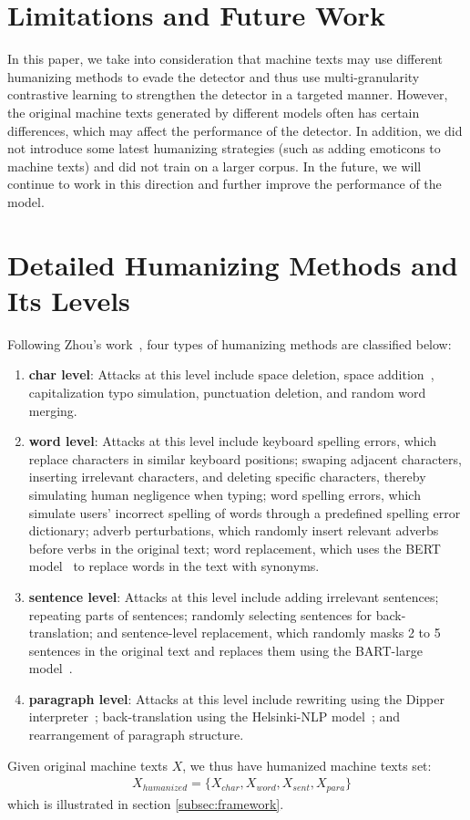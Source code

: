 \documentclass[11pt]{article}
\newcommand{\greenCitep}[1]{\textcolor{darkgreen}{\citep{#1}}}
\begin{document}
	
	\section{Limitations and Future Work}
	In this paper, we take into consideration that machine texts may use different humanizing methods to evade the detector and thus use multi-granularity contrastive learning to strengthen the detector in a targeted manner. However, the original machine texts generated by different models often has certain differences, which may affect the performance of the detector. In addition, we did not introduce some latest humanizing strategies (such as adding emoticons to machine texts) and did not train on a larger corpus. In the future, we will continue to work in this direction and further improve the performance of the model.

	\section{Detailed Humanizing Methods and Its Levels}
	\label{appendix:humanizing methods}
	Following Zhou's work~\cite{zhou2024navigatingshadows}, four types of humanizing methods are classified below:
	\begin{enumerate}
		\item \textbf{char level}: Attacks at this level include space deletion, space addition~\greenCitep{cai2023evadechatgpt}, capitalization typo simulation, punctuation deletion, and random word merging.
		\item \textbf{word level}: Attacks at this level include keyboard spelling errors, which replace characters in similar keyboard positions; swaping adjacent characters, inserting irrelevant characters, and deleting specific characters, thereby simulating human negligence when typing; word spelling errors, which simulate users' incorrect spelling of words through a predefined spelling error dictionary; adverb perturbations, which randomly insert relevant adverbs before verbs in the original text; word replacement, which uses the BERT model~\greenCitep{devlin2019bert} to replace words in the text with synonyms.
		\item \textbf{sentence level}: Attacks at this level include adding irrelevant sentences; repeating parts of sentences; randomly selecting sentences for back-translation; and sentence-level replacement, which randomly masks 2 to 5 sentences in the original text and replaces them using the BART-large model~\greenCitep{lewis2020bart}.
		\item \textbf{paragraph level}: Attacks at this level include rewriting using the Dipper interpreter~\greenCitep{krishna2024paraphrasing}; back-translation using the Helsinki-NLP model~\greenCitep{tiedemann2020opus}; and rearrangement of paragraph structure.
	\end{enumerate}
	Given original machine texts $X$, we thus have humanized machine texts set:
	$$
	\begin{aligned}
		&X_{humanized}=\{X_{char},X_{word},X_{sent},X_{para}\}
	\end{aligned}
	$$
	which is illustrated in section \ref{subsec:framework}.
\end{document}
